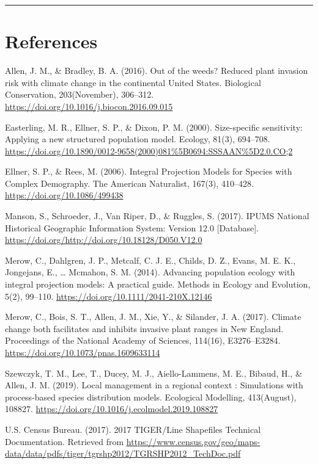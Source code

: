 \documentclass[]{article}
\begin{document}
\begin{center}\rule{0.5\linewidth}{\linethickness}\end{center}

\section{References}

Allen, J. M., \& Bradley, B. A. (2016). Out of the weeds? Reduced plant
invasion risk with climate change in the continental United States.
Biological Conservation, 203(November), 306--312.
\url{https://doi.org/10.1016/j.biocon.2016.09.015}

Easterling, M. R., Ellner, S. P., \& Dixon, P. M. (2000). Size-specific
sensitivity: Applying a new structured population model. Ecology, 81(3),
694--708.
\url{https://doi.org/10.1890/0012-9658(2000)081\%5B0694:SSSAAN\%5D2.0.CO;2}

Ellner, S. P., \& Rees, M. (2006). Integral Projection Models for
Species with Complex Demography. The American Naturalist, 167(3),
410--428. \url{https://doi.org/10.1086/499438}

Manson, S., Schroeder, J., Van Riper, D., \& Ruggles, S. (2017). IPUMS
National Historical Geographic Information System: Version 12.0
{[}Database{]}. \url{https://doi.org/http://doi.org/10.18128/D050.V12.0}

Merow, C., Dahlgren, J. P., Metcalf, C. J. E., Childs, D. Z., Evans, M.
E. K., Jongejans, E., \ldots{} Mcmahon, S. M. (2014). Advancing
population ecology with integral projection models: A practical guide.
Methods in Ecology and Evolution, 5(2), 99--110.
\url{https://doi.org/10.1111/2041-210X.12146}

Merow, C., Bois, S. T., Allen, J. M., Xie, Y., \& Silander, J. A.
(2017). Climate change both facilitates and inhibits invasive plant
ranges in New England. Proceedings of the National Academy of Sciences,
114(16), E3276--E3284. \url{https://doi.org/10.1073/pnas.1609633114}

Szewczyk, T. M., Lee, T., Ducey, M. J., Aiello-Lammens, M. E., Bibaud,
H., \& Allen, J. M. (2019). Local management in a regional context :
Simulations with process-based species distribution models. Ecological
Modelling, 413(August), 108827.
\url{https://doi.org/10.1016/j.ecolmodel.2019.108827}

U.S. Census Bureau. (2017). 2017 TIGER/Line Shapefiles Technical
Documentation. Retrieved from
\url{https://www.census.gov/geo/maps-data/data/pdfs/tiger/tgrshp2012/TGRSHP2012_TechDoc.pdf}
\end{document}
